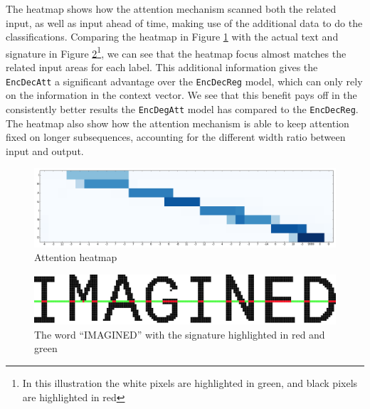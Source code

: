 The heatmap shows how the attention mechanism scanned both the related input, as well as input ahead of time, making use of the additional data to do the classifications. Comparing the heatmap in Figure \ref{fig:attention_heatmap} with the actual text and signature in Figure  \ref{fig:imagine_highlighted}\footnote{In this illustration the white pixels are highlighted in green, and black pixels are highlighted in red}, we can see that the heatmap focus almost matches the related input areas for each label. This additional information gives the {\tt EncDecAtt} a significant advantage over the {\tt EncDecReg} model, which can only rely on the information in the context vector. We see that this benefit pays off in the consistently better results the {\tt EncDegAtt} model has compared to the {\tt EncDecReg}. The heatmap also show how the attention mechanism is able to keep attention fixed on longer subsequences, accounting for the different width ratio between input and output.

\begin{figure}[ht]
    \centering
    \includegraphics[width=1\textwidth]{fig/conclusion/attention_crop.png}
    \caption{Attention heatmap}
    \label{fig:attention_heatmap}
\end{figure}

\begin{figure}[ht]
    \centering
    \includegraphics[width=1\textwidth]{fig/conclusion/imagined_grid_exported.jpg}
    \caption{The word ``IMAGINED'' with the signature highlighted in red and green}
    \label{fig:imagine_highlighted}
\end{figure}
